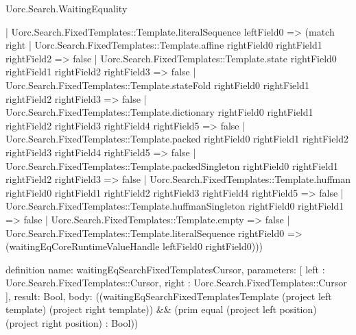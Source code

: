 \begin{lexlean}{Uorc.Search.WaitingEquality}
\begin{semanticmodule}
{    | Uorc.Search.FixedTemplates::Template.literalSequence leftField0 => (match right
      | Uorc.Search.FixedTemplates::Template.affine rightField0 rightField1 rightField2 => false
      | Uorc.Search.FixedTemplates::Template.state rightField0 rightField1 rightField2 rightField3 => false
      | Uorc.Search.FixedTemplates::Template.stateFold rightField0 rightField1 rightField2 rightField3 => false
      | Uorc.Search.FixedTemplates::Template.dictionary rightField0 rightField1 rightField2 rightField3 rightField4 rightField5 => false
      | Uorc.Search.FixedTemplates::Template.packed rightField0 rightField1 rightField2 rightField3 rightField4 rightField5 => false
      | Uorc.Search.FixedTemplates::Template.packedSingleton rightField0 rightField1 rightField2 rightField3 => false
      | Uorc.Search.FixedTemplates::Template.huffman rightField0 rightField1 rightField2 rightField3 rightField4 rightField5 => false
      | Uorc.Search.FixedTemplates::Template.huffmanSingleton rightField0 rightField1 => false
      | Uorc.Search.FixedTemplates::Template.empty => false
      | Uorc.Search.FixedTemplates::Template.literalSequence rightField0 => (waitingEqCoreRuntimeValueHandle leftField0 rightField0)))
}

definition{
  name: waitingEqSearchFixedTemplatesCursor,
  parameters: [
    left : Uorc.Search.FixedTemplates::Cursor,
    right : Uorc.Search.FixedTemplates::Cursor
  ],
  result: Bool,
  body: ((waitingEqSearchFixedTemplatesTemplate (project left template) (project right template)) && (prim equal (project left position) (project right position) : Bool))
}


\end{semanticmodule}
\end{lexlean}
